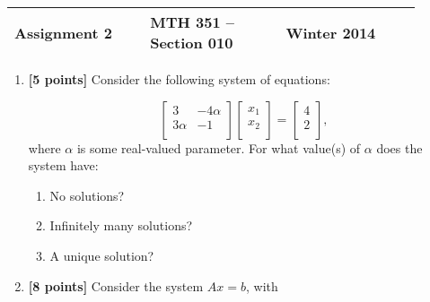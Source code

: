 \documentclass{article}
\newcommand{\myspace}{0.4cm}
\begin{document}
\begin{center}

\large
\begin{tabular}{L{0.3\linewidth} C{0.3\linewidth} R{0.3\linewidth}}
\hline
Assignment 2	&MTH 351 -- Section 010		&Winter 2014 \\
\hline
\end{tabular}

\vspace{\myspace}

\end{center}

\begin{enumerate}

\item {\bf [5 points]} Consider the following system of equations:

\begin{equation*}
\begin{bmatrix}
3		&-4\alpha \\
3\alpha	&-1\\
\end{bmatrix}  \begin{bmatrix}x_1 \\ x_2 \\ \end{bmatrix}= \begin{bmatrix}4 \\ 2 \\ \end{bmatrix},
\end{equation*}
where $\alpha$ is some real-valued parameter. For what value(s) of $\alpha$ does the system have:
\begin{enumerate} 
\item No solutions?
\item Infinitely many solutions?
\item A unique solution?
\end{enumerate}

\item {\bf[8 points]} Consider the system $Ax = b$, with 


\end{enumerate}
\end{document}
